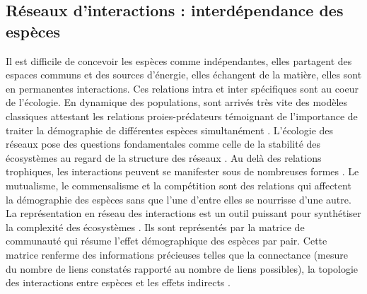 \subsection{Réseaux d'interactions : interdépendance des espèces}

Il est difficile de concevoir les espèces comme indépendantes, elles
partagent des espaces communs et des sources d'énergie, elles échangent
de la matière, elles sont en permanentes interactions. Ces relations
intra et inter spécifiques sont au coeur de l'écologie. En dynamique des
populations, sont arrivés très vite des modèles classiques attestant les
relations proies-prédateurs témoignant de l'importance de traiter la
démographie de différentes espèces simultanément . L'écologie des
réseaux pose des questions fondamentales comme celle de la stabilité des
écosystèmes au regard de la structure des réseaux \cite{Allesina2012}.
Au delà des relations trophiques, les interactions peuvent se manifester
sous de nombreuses formes \cite{Kefi2012}. Le mutualisme, le
commensalisme et la compétition sont des relations qui affectent la
démographie des espèces sans que l'une d'entre elles se nourrisse d'une
autre. La représentation en réseau des interactions est un outil
puissant pour synthétiser la complexité des écosystèmes
\cite{Sole2006,Pascual2006}. Ils sont représentés par la matrice de
communauté qui résume l'effet démographique des espèces par pair. Cette
matrice renferme des informations précieuses telles que la connectance
(mesure du nombre de liens constatés rapporté au nombre de liens
possibles), la topologie des interactions entre espèces \cite{Sole2006}
et les effets indirects \cite{Bender1984, Montoya2009}.

